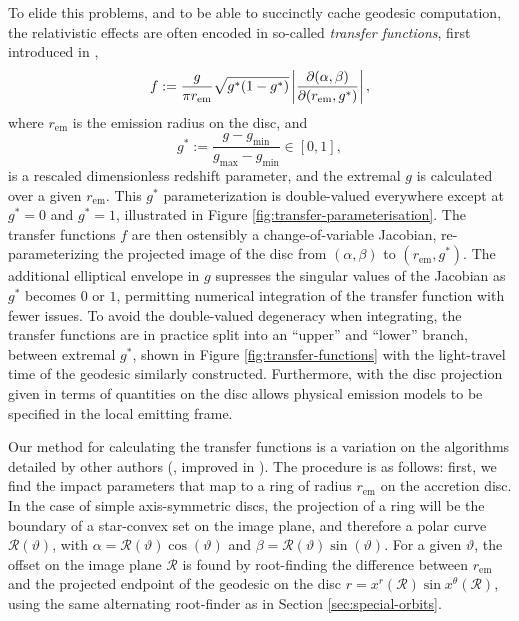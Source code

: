 To elide this problems, and to be able to succinctly cache geodesic computation, the relativistic effects are often encoded in so-called \emph{transfer functions}, first introduced in \cite{cunningham_effects_1975},
\begin{equation}
    f:=\frac{g}{\pi r_\text{em}} \sqrt{g^\ast(1 - g^\ast)} \left\lvert \frac{\partial (\alpha, \beta)}{\partial (r_\text{em}, g^\ast)} \right\rvert,
\end{equation}
where $r_\text{em}$ is the emission radius on the disc, and
\begin{equation}
    g^\ast := \frac{g - g_\text{min}}{g_\text{max} - g_\text{min}} \in [0, 1],
\end{equation}
is a rescaled dimensionless redshift parameter, and the extremal $g$ is calculated over a given $r_\text{em}$. This $g^\ast$ parameterization is double-valued everywhere except at $g^\ast = 0$ and $g^\ast = 1$, illustrated in Figure \ref{fig:transfer-parameterisation}. The transfer functions $f$ are then ostensibly a change-of-variable Jacobian, re-parameterizing the projected image of the disc from $(\alpha, \beta)$ to $(r_\text{em}, g^\ast)$. The additional elliptical envelope in $g$ supresses the singular values of the Jacobian as $g^\ast$ becomes $0$ or $1$, permitting numerical integration of the transfer function with fewer issues. To avoid the double-valued degeneracy when integrating, the transfer functions are in practice split into an ``upper'' and ``lower'' branch, between extremal $g^\ast$, shown in Figure \ref{fig:transfer-functions} with the light-travel time of the geodesic similarly constructed. Furthermore, with the disc projection given in terms of quantities on the disc allows physical emission models to be specified in the local emitting frame.

Our method for calculating the transfer functions is a variation on the algorithms detailed by other authors (\citealp{speith_photon_1995,bambi_testing_2017}, improved in \citealp{abdikamalov_public_2019}). The procedure is as follows: first, we find the impact parameters that map to a ring of radius $r_\text{em}$ on the accretion disc. In the case of simple axis-symmetric discs, the projection of a ring will be the boundary of a star-convex set on the image plane, and therefore a polar curve $\mathcal{R}(\vartheta)$, with $\alpha = \mathcal{R}(\vartheta) \cos(\vartheta)$ and $\beta = \mathcal{R}(\vartheta) \sin(\vartheta)$. For a given $\vartheta$, the offset on the image plane $\mathcal{R}$ is found by root-finding the difference between $r_\text{em}$ and the projected endpoint of the geodesic on the disc $r = x^r (\mathcal{R}) \sin x^\theta(\mathcal{R})$, using the same alternating root-finder as in Section \ref{sec:special-orbits}.

